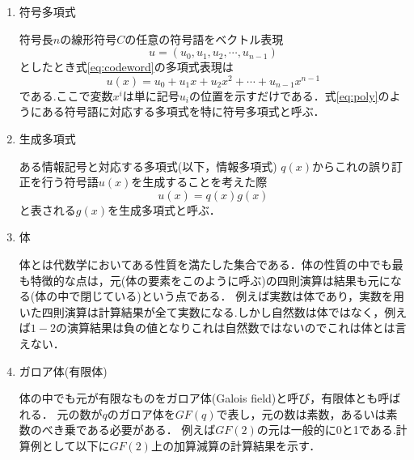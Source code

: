 \documentclass{thesis}
\begin{document}
\begin{enumerate}
\item 符号多項式

符号長$n$の線形符号$C$の任意の符号語をベクトル表現
\begin{equation}
u = (u_0,u_1,u_2,\cdots,u_{n-1})
\label{eq:codeword}
\end{equation}
としたとき式\ref{eq:codeword}の多項式表現は
\begin{equation}
u(x) = u_0+u_1x+u_2x^2+\cdots+u_{n-1}x^{n-1}
\label{eq:poly}
\end{equation}
である.ここで変数$x^i$は単に記号$u_i$の位置を示すだけである．式\ref{eq:poly}のようにある符号語に対応する多項式を特に符号多項式と呼ぶ\cite{KISO}．

\item 生成多項式

ある情報記号と対応する多項式(以下，情報多項式) $q(x)$からこれの誤り訂正を行う符号語$u(x)$を生成することを考えた際
\begin{equation}
u(x) = q(x)g(x)
\label{eq:gen_poly}
\end{equation}
と表される$g(x)$を生成多項式と呼ぶ\cite{KISO}．

\item 体

体とは代数学においてある性質を満たした集合である．体の性質の中でも最も特徴的な点は，元(体の要素をこのように呼ぶ)の四則演算は結果も元になる(体の中で閉じている)という点である．
例えば実数は体であり，実数を用いた四則演算は計算結果が全て実数になる.しかし自然数は体ではなく，例えば$1-2$の演算結果は負の値となりこれは自然数ではないのでこれは体とは言えない．


\item ガロア体(有限体)

体の中でも元が有限なものをガロア体(Galois field)と呼び，有限体とも呼ばれる．
元の数が$q$のガロア体を$GF(q)$で表し，元の数は素数，あるいは素数のべき乗である必要がある\cite{KISO}．
例えば$GF(2)$の元は一般的に0と1である.計算例として以下に$GF(2)$上の加算減算の計算結果を示す．


\end{enumerate}
\end{document}
